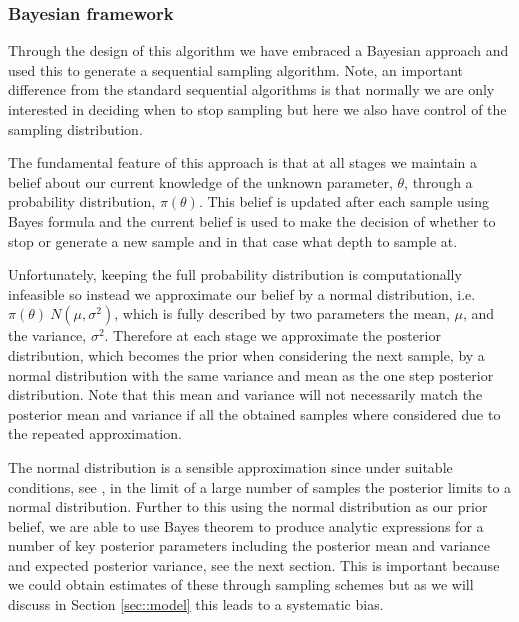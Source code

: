 \subsubsection{Bayesian framework}\label{sec::bayes}
Through the design of this algorithm we have embraced a Bayesian approach \cite{} and used this to generate a sequential sampling algorithm. Note, an important difference from the standard sequential algorithms is that normally we are only interested in deciding when to stop sampling but here we also have control of the sampling distribution.

The fundamental feature of this approach is that at all stages we maintain a belief about our current knowledge of the unknown parameter, $\theta$, through a probability distribution, $\pi(\theta)$. This belief is updated after each sample using Bayes formula \cite{} and the current belief is used to make the decision of whether to  stop or generate a new sample and in that case what depth to sample at.

Unfortunately, keeping the full probability distribution is computationally infeasible so instead we approximate our belief by a normal distribution, i.e. $\pi(\theta)~N(\mu,\sigma^2)$, which is fully described by two parameters the mean, $\mu$, and the variance, $\sigma^2$. Therefore at each stage we approximate the posterior distribution, which becomes the prior when considering the next sample, by a normal distribution with the same variance and mean as the one step posterior distribution. Note that this mean and variance will not necessarily match the posterior mean and variance if all the obtained samples where considered due to the repeated approximation.

The normal distribution is a sensible approximation since under suitable conditions, see \cite{}, in the limit of a large number of samples the posterior limits to a normal distribution. Further to this using the normal distribution as our prior belief, we are able to use Bayes theorem to produce analytic expressions for a number of key posterior parameters including the posterior mean and variance and expected posterior variance, see the next section. This is important because we could obtain estimates of these through sampling schemes \cite{} but as we will discuss in Section \ref{sec::model} this leads to a systematic bias.


